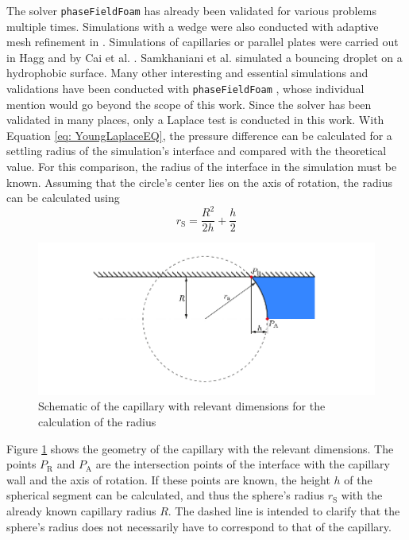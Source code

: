 The solver \texttt{phaseFieldFoam} has already been validated for various problems multiple times. Simulations with a wedge were also conducted with adaptive mesh refinement in \cite{holzinger2021DirectNumericalSimulation}. Simulations of capillaries or parallel plates were carried out in Hagg \cite{hagg2019DirekteNumerischeSimulation} and by Cai et al. \cite{cai2015NumericalSimulationWetting}. Samkhaniani et al. \cite{samkhaniani2021BouncingDropImpingement} simulated a bouncing droplet on a hydrophobic surface. Many other interesting and essential simulations and validations have been conducted with \texttt{phaseFieldFoam} \cite{bodziony2023StressfulWayDroplets,yinDirectNumericalSimulation,worner2021SpreadingReboundDynamics,bagheriInterfacialRelaxationCrucial2022}, whose individual mention would go beyond the scope of this work.
Since the solver has been validated in many places, only a Laplace test is conducted in this work. With Equation \ref{eq: YoungLaplaceEQ}, the pressure difference can be calculated for a settling radius of the simulation's interface and compared with the theoretical value. For this comparison, the radius of the interface in the simulation must be known. Assuming that the circle's center lies on the axis of rotation, the radius can be calculated using
\begin{equation}
    r_{\mathrm{S}} = \frac{R^2}{2h}+\frac{h}{2}
\end{equation}
\begin{figure}[h]
    \centering
    \includegraphics[width=.95\textwidth]{Pictures/RadiusCalc.pdf}
    \caption{Schematic of the capillary with relevant dimensions for the calculation of the radius}
    \label{fig: RadiusCalc}
\end{figure}

Figure \ref*{fig: RadiusCalc} shows the geometry of the capillary with the relevant dimensions. The points $P_{\mathrm{R}}$ and $P_{\mathrm{A}}$ are the intersection points of the interface with the capillary wall and the axis of rotation. If these points are known, the height $h$ of the spherical segment can be calculated, and thus the sphere's radius $r_{\mathrm{S}}$ with the already known capillary radius $R$. The dashed line is intended to clarify that the sphere's radius does not necessarily have to correspond to that of the capillary.
